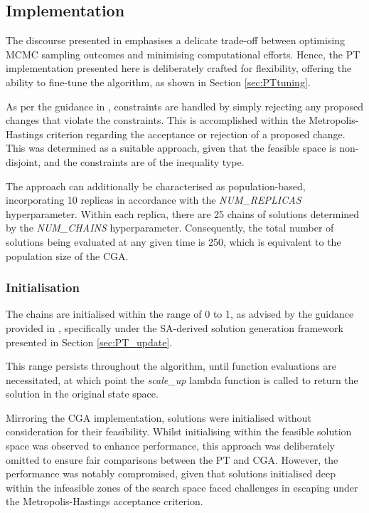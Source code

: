 \documentclass[10pt]{article}
\begin{document}
\begin{multicols}{2}
\subsection{Implementation}

The discourse presented in \cite{Earl_2005} emphasises a delicate trade-off between optimising MCMC sampling outcomes and minimising computational efforts. Hence, the PT implementation presented here is deliberately crafted for flexibility, offering the ability to fine-tune the algorithm, as shown in Section \ref{sec:PTtuning}.

As per the guidance in \cite{parks2023geneticalgorithmsSA}, constraints are handled by simply rejecting any proposed changes that violate the constraints. This is accomplished within the Metropolis-Hastings criterion regarding the acceptance or rejection of a proposed change. This was determined as a suitable approach, given that the feasible space is non-disjoint, and the constraints are of the inequality type.

The approach can additionally be characterised as population-based, incorporating 10 replicas in accordance with the \textit{NUM\_REPLICAS} hyperparameter. Within each replica, there are 25 chains of solutions determined by the \textit{NUM\_CHAINS} hyperparameter. Consequently, the total number of solutions being evaluated at any given time is 250, which is equivalent to the population size of the CGA.

\subsubsection{Initialisation}
The chains are initialised within the range of 0 to 1, as advised by the guidance provided in \cite{NT90-A34350}, specifically under the SA-derived solution generation framework presented in Section \ref{sec:PT_update}.

This range persists throughout the algorithm, until function evaluations are necessitated, at which point the \textit{scale\_up} lambda function is called to return the solution in the original state space.

Mirroring the CGA implementation, solutions were initialised without consideration for their feasibility. Whilst initialising within the feasible solution space was observed to enhance performance, this approach was deliberately omitted to ensure fair comparisons between the PT and CGA. However, the performance was notably compromised, given that solutions initialised deep within the infeasible zones of the search space faced challenges in escaping under the Metropolis-Hastings acceptance criterion.


\end{multicols}
\end{document}
